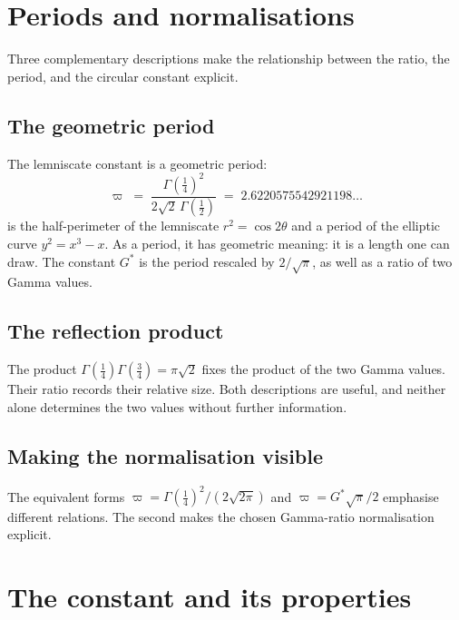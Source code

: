 \documentclass[12pt,reqno]{amsart}
\theoremstyle{definition}
\theoremstyle{remark}
\newcommand{\Gstar}{G^{\!*}}
\newcommand{\varpiup}{\varpi}
\begin{document}
\section{Periods and normalisations}

Three complementary descriptions make the relationship between the
ratio, the period, and the circular constant explicit.

\subsection{The geometric period}

The lemniscate constant is a geometric period:
\begin{equation}\label{eq:varpi}
  \varpiup \;=\; \frac{\Gamma(\tfrac14)^{2}}{2\sqrt{2}\,\Gamma(\tfrac12)}
  \;=\; 2.6220575542921198\ldots
\end{equation}
is the half-perimeter of the lemniscate $r^{2}=\cos 2\theta$ and a
period of the elliptic curve $y^{2}=x^{3}-x$.  As a period, it has
geometric meaning: it is a length one can draw. The constant $\Gstar$
is the period rescaled by $2/\sqrt\pi$, as well as a ratio of two
Gamma values.

\subsection{The reflection product}

The product $\Gamma(\tfrac14)\Gamma(\tfrac34)=\pi\sqrt2$ fixes the
product of the two Gamma values. Their ratio records their relative
size. Both descriptions are useful, and neither alone determines
the two values without further information.

\subsection{Making the normalisation visible}

The equivalent forms
$\varpiup=\Gamma(\tfrac14)^2/(2\sqrt{2\pi})$ and
$\varpiup=\Gstar\sqrt\pi/2$ emphasise different relations.
The second makes the chosen Gamma-ratio normalisation explicit.


\section{The constant and its properties}
\end{document}
